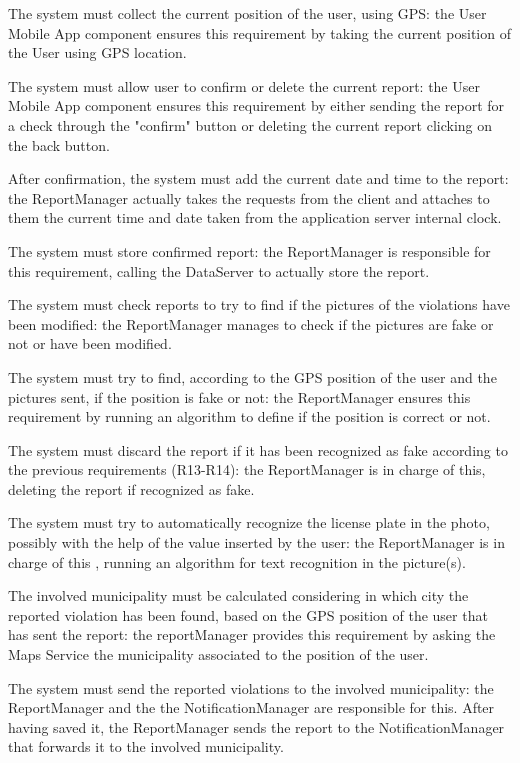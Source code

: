 \documentclass[a4paper]{report}
\begin{document}
\begin{enumerate}[start=1,label={[R\arabic*]}]
\item The system must collect the current position of the user, using GPS: the User Mobile App component ensures this requirement by taking the current position of the User using GPS location.
\item The system must allow user to confirm or delete the current report: the User Mobile App component ensures this requirement by either sending the report for a check through the "confirm" button or deleting the current report clicking on the back button.
\item After confirmation, the system must add the current date and time to the report: the ReportManager actually takes the requests from the client and attaches to them the current time and date taken from the application server internal clock.
\item The system must store confirmed report: the ReportManager is responsible for this requirement, calling the DataServer to actually store the report.
\item The system must check reports to try to find if the pictures of the violations have been modified: the ReportManager manages to check if the pictures are fake or not or have been modified.
\item The system must try to find, according to the GPS position of the user and the pictures sent, if the position is fake or not: the ReportManager ensures this requirement by running an algorithm to define if the position is correct or not. 
\item The system must discard the report if it has been recognized as fake according to the previous requirements (R13-R14): the ReportManager is in charge of this, deleting the report if recognized as fake.
\item The system must try to automatically recognize the license plate in the photo, possibly with the help of the value inserted by the user: the ReportManager is in charge of this , running an algorithm for text recognition in the picture(s).
\item The involved municipality must be calculated considering in which city the reported violation has been found, based on the GPS position of the user that has sent the report: the reportManager provides this requirement by asking the Maps Service the municipality associated to the position of the user.
\item The system must send the reported violations to the involved municipality: the ReportManager and the the NotificationManager are responsible for this. After having saved it, the ReportManager sends the report to the NotificationManager that forwards it to the involved municipality.

\end{enumerate}
\end{document}
